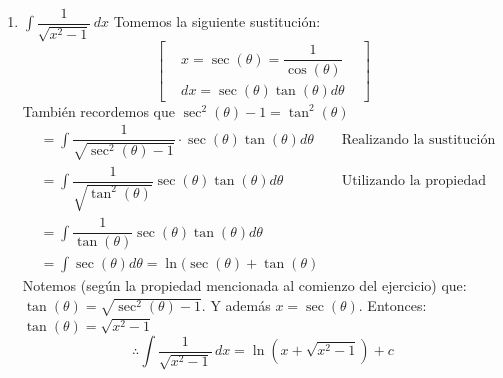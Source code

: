 \documentclass[letterpaper]{article}
\renewcommand{\*}{\cdot}
\theoremstyle{definition}
\begin{document}
\begin{enumerate}
\begin{enumerate}
\item$\displaystyle \int  \dfrac{1}{ \sqrt{x^2 - 1}} \, dx$
Tomemos la siguiente sustitución:
\[  \begin{bmatrix}
& x = \sec(\theta)= \dfrac{1}{\cos(\theta)} &\\
&dx = \sec(\theta)\tan(\theta)d\theta&
\end{bmatrix} \]
También recordemos que $\sec^{2}(\theta)-1= \tan^{2}(\theta)$
\begin{align*}
	&= \int \dfrac{1}{\sqrt{\sec^{2}(\theta)-1}}\cdot \sec(\theta)\tan(\theta)d\theta &&\text{Realizando la sustitución}\\
	&= \int \dfrac{1}{\sqrt{\tan^{2}(\theta)}}\sec(\theta)\tan(\theta)d\theta &&\text{Utilizando la propiedad anterior}\\
	&= \int \dfrac{1}{\tan(\theta)} \sec(\theta)\tan(\theta)d\theta\\
	&= \int \sec(\theta)d\theta = \ln(\sec(\theta)+\tan(\theta)
\end{align*}
Notemos (según la propiedad mencionada al comienzo del ejercicio) que: $\tan(\theta)= \sqrt{\sec^{2}(\theta)-1}$. Y además $x = \sec(\theta)$. Entonces: $\tan(\theta)=\sqrt{x^{2}-1}$
\[\therefore \int  \dfrac{1}{ \sqrt{x^2 - 1}} \, dx = \ln(x+\sqrt{x^{2}-1})+c\]
\end{enumerate}


\end{enumerate}
\end{document}
